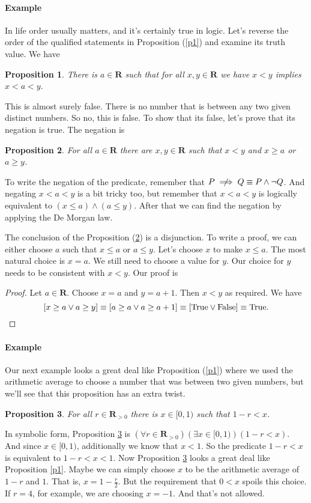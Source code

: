 \documentclass[12pt,fleqn]{article}
\newcommand{\reals}{\mathbf{R}}
\newcommand{\true}{\mathrm{True}}
\newcommand{\false}{\mathrm{False}}
\newcommand{\notimplies}{\centernot\implies}
\newenvironment{myproof}
  {\begin{shaded}\begin{proof}}
  {\end{proof}\end{shaded}}
\newtheorem{prop}{Proposition}
\newcounter{ex}\setcounter{ex}{0}
\newcommand{\ex}{%
\setcounter{ex}{\value{ex}+1}
\paragraph{Example \theex}}
\begin{document}
 \ex In life order usually matters, and it's certainly true in logic.  Let's reverse the order of the qualified statements in Proposition 
 (\ref{p1}) and examine its truth value. We have 

 \begin{prop}
  There is $a \in \reals$ such that for all $x,y \in \reals$ we have
    $x < y$ implies $x<a<y$. \label{p2}   
\end{prop}
This is almost surely false. There is no number that is between 
any two given distinct numbers. So no, this is false. To show that its false,
let's prove that its negation is true. The negation is

\begin{prop}
  For all $a \in \reals$ there are  $x,y \in \reals$ such that
    $x < y$ and  $x \geq a$ or $a \geq y$. \label{p3} 
\end{prop}
To write the negation of the predicate, remember that
$P \notimplies Q \equiv P \land \lnot Q$. And negating $x<a<y$ is 
a bit tricky too, but remember that 
$x<a<y$ is logically equivalent to $(x \leq a) \land (a \leq y)$. After that 
we can find the negation by applying the De Morgan law.

The conclusion of the Proposition (\ref{p3}) is a disjunction.
To write a proof, we can either choose $a$ such that $x \leq a$
or $a \leq y$. Let's choose $x$ to make  $x \leq a$. The most
natural choice is $x = a$. We still need to choose a value for $y$.
Our choice for $y$ needs to be consistent with $x < y$. Our proof is

\begin{myproof} Let $a \in \reals$.  Choose $x=a$ and $y=a+1$.
  Then $x < y$ as required. We have
  \begin{equation*}
    \left[x \geq a \lor  a \geq y \right] 
    \equiv \left[a \geq a \lor  a \geq a+1 \right]
    \equiv \left[\true  \lor  \false  \right]
    \equiv \true. \qedhere
  \end{equation*}
\end{myproof}

\ex Our next example looks a great deal like Proposition  (\ref{p1}) where we used the arithmetic average to choose
a number that was between two given numbers,  but we'll see that this proposition has an extra twist.
\begin{prop} 
     For all $r \in \reals_{>0}$ there is $x \in [0,1)$ such that $1-r < x$.  \label{p4}
\end{prop}

In symbolic form, Proposition \ref{p4} is $\left(\forall r  \in \reals_{>0} \right) \left(\exists x \in [0,1)\right) \left (1-r  < x \right)$.
And since $x \in [0,1)$, additionally we know that $x < 1$.  So the predicate $1-r  < x$ is equivalent to $1-r  < x  < 1$. Now Proposition \ref{p4}
looks a great deal like  Proposition \ref{p1}. Maybe we can simply 
choose $x$ to be the arithmetic average of $1-r$ and $1$. That is,
$x = 1 - \frac{r}{2}$.  But the requirement that $0 < x$ spoils this choice. If $r = 4$, for example, we are choosing $x = -1$. And that's 
not allowed.    
\end{document}
